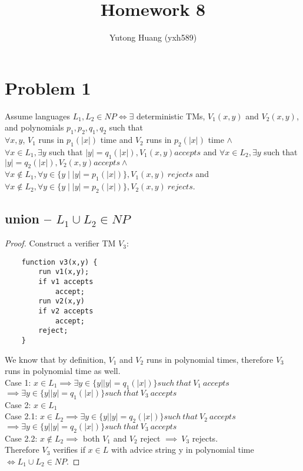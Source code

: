 \documentclass[letterpaper]{article}
\title{\vspace{-2cm}Homework 8}
\author{Yutong Huang (yxh589)}
\date{}
\begin{document}
\maketitle

\section*{Problem 1}
Assume languages $L_1, L_2 \in NP \iff \exists$ deterministic TMs, $V_1(x, y)$ and $V_2(x, y)$, and polynomials $p_1, p_2, q_1, q_2$ such that\\
$\forall x, y$, $V_1$ runs in $p_1(|x|)$ time and $V_2$ runs in $p_2(|x|)$ time $\land$\\
$\forall x \in L_1, \exists y$ such that $|y|=q_1(|x|), V_1(x, y) accepts$ and $\forall x \in L_2, \exists y$ such that $|y|=q_2(|x|), V_2(x, y) accepts\land$\\
$\forall x \notin L_1, \forall y \in \{y \mid |y| = p_1(|x|)\}, V_1(x, y)\ rejects$ and $\forall x \notin L_2, \forall y \in \{y \mid |y| = p_2(|x|)\}, V_2(x, y)\ rejects$.
\subsection*{union -- $L_1 \cup L_2 \in NP$}
\begin{proof}
Construct a verifier TM $V_3$:
\begin{verbatim}
    function v3(x,y) {
        run v1(x,y);
        if v1 accepts
            accept;
        run v2(x,y)
        if v2 accepts
            accept;
        reject;
    }
\end{verbatim}
We know that by definition, $V_1$ and $V_2$ runs in polynomial times, therefore $V_3$ runs in polynomial time as well.\\

Case 1: $x\in L_1 \implies \exists y \in \{y||y| = q_1(|x|)\} such\ that\ V_1\ accepts$ $\implies \exists y \in \{y||y| = q_1(|x|)\} such\ that\ V_3\ accepts$\\
Case 2: $x\in L_1$\\
Case 2.1: $x \in L_2\implies \exists y \in \{y||y| = q_2(|x|)\} such\ that\ V_2\ accepts$ $\implies \exists y \in \{y||y| = q_2(|x|)\} such\ that\ V_3\ accepts$\\
Case 2.2: $x \notin L_2 \implies$ both $V_1$ and $V_2$ reject $\implies\ V_3$ rejects.\\

Therefore $V_3$ verifies if $x\in L$ with advice string y in polynomial time $\iff L_1 \cup L_2 \in NP$.
\end{proof}
\end{document}

